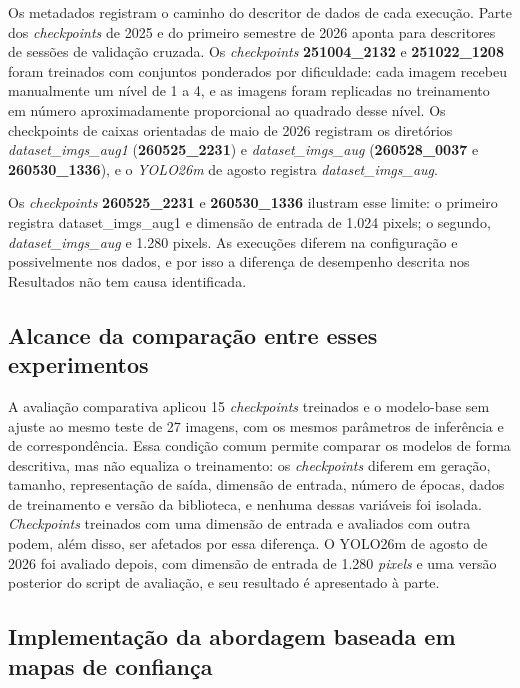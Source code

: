 Os metadados registram o caminho do descritor de dados de cada execu\c{c}\~ao. Parte dos \textit{checkpoints} de 2025 e do primeiro semestre de 2026 aponta para descritores de sess\~oes de valida\c{c}\~ao cruzada. Os \textit{checkpoints} \textbf{251004\_2132} e \textbf{251022\_1208} foram treinados com conjuntos ponderados por dificuldade: cada imagem recebeu manualmente um n\'ivel de 1 a 4, e as imagens foram replicadas no treinamento em n\'umero aproximadamente proporcional ao quadrado desse n\'ivel. Os checkpoints de caixas orientadas de maio de 2026 registram os diret\'orios \textit{dataset\_imgs\_aug1} (\textbf{260525\_2231}) e \textit{dataset\_imgs\_aug} (\textbf{260528\_0037} e \textbf{260530\_1336}), e o \textit{YOLO26m} de agosto registra \textit{dataset\_imgs\_aug}.

Os \textit{checkpoints} \textbf{260525\_2231} e \textbf{260530\_1336} ilustram esse limite: o primeiro registra dataset\_imgs\_aug1 e dimens\~ao de entrada de 1.024 pixels; o segundo, \textit{dataset\_imgs\_aug} e 1.280 pixels. As execu\c{c}\~oes diferem na configura\c{c}\~ao e possivelmente nos dados, e por isso a diferen\c{c}a de desempenho descrita nos Resultados n\~ao tem causa identificada.

\subsection{Alcance da compara\c{c}\~ao entre esses experimentos}
\label{sec:alcance-comparacao}

A avalia\c{c}\~ao comparativa aplicou 15 \textit{checkpoints} treinados e o modelo-base sem ajuste ao mesmo teste de 27 imagens, com os mesmos par\^ametros de infer\^encia e de correspond\^encia. Essa condi\c{c}\~ao comum permite comparar os modelos de forma descritiva, mas n\~ao equaliza o treinamento: os \textit{checkpoints} diferem em gera\c{c}\~ao, tamanho, representa\c{c}\~ao de sa\'ida, dimens\~ao de entrada, n\'umero de \'epocas, dados de treinamento e vers\~ao da biblioteca, e nenhuma dessas vari\'aveis foi isolada. \textit{Checkpoints} treinados com uma dimens\~ao de entrada e avaliados com outra podem, al\'em disso, ser afetados por essa diferen\c{c}a. O YOLO26m de agosto de 2026 foi avaliado depois, com dimens\~ao de entrada de 1.280 \textit{pixels} e uma vers\~ao posterior do script de avalia\c{c}\~ao, e seu resultado \'e apresentado \`a parte.

\subsection{Implementa\c{c}\~ao da abordagem baseada em mapas de confian\c{c}a}
\label{sec:implementacao-mapas-confianca}

